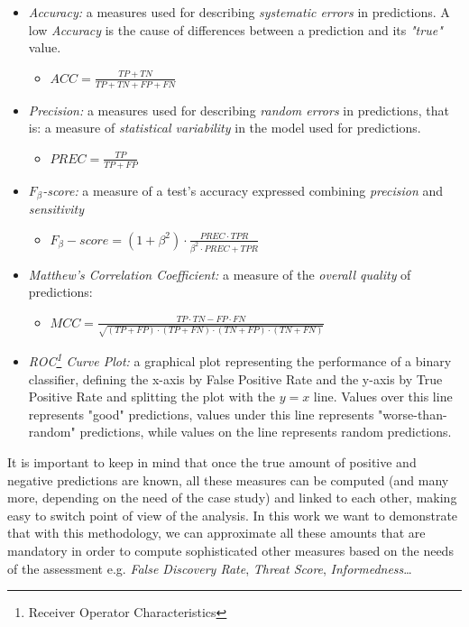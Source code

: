 \begin{itemize}
	\item \textsl{Accuracy:} a measures used for describing \textsl{systematic errors} in predictions. A low \textsl{Accuracy} is the cause of differences between a prediction and its \textsl{"true"} value.
	\begin{itemize}
		\item[] $ACC = \frac{TP+TN}{TP+TN+FP+FN}$
	\end{itemize}
	\item \textsl{Precision:} a measures used for describing \textsl{random errors} in predictions, that is: a measure of \textsl{statistical variability} in the model used for predictions.
	\begin{itemize}
	\item[] $PREC = \frac{TP}{TP+FP}$
	\end{itemize}
	\item \textsl{$F_{\beta}$-score:} a measure of a test's accuracy expressed combining \textsl{precision} and \textsl{sensitivity}
	\begin{itemize}
		\item[] $F_{\beta}-score = (1+\beta ^{2})\cdot \frac{PREC\cdot TPR}{\beta ^{2}\cdot PREC+TPR}$
	\end{itemize}
	\item \textsl{Matthew's Correlation Coefficient:} a measure of the \textsl{overall quality} of predictions:
	\begin{itemize}
		\item[] $MCC = \frac{TP\cdot TN - FP\cdot FN}{\sqrt{(TP+FP)\cdot (TP+FN)\cdot (TN+FP)\cdot (TN+FN)}}$
	\end{itemize}
	\item \textsl{ROC\footnote{Receiver Operator Characteristics} Curve Plot:} a graphical plot representing the performance of a binary classifier, defining the x-axis by False Positive Rate and the y-axis by True Positive Rate and splitting the plot with the $y=x$ line. Values over this line represents "good" predictions, values under this line represents "worse-than-random" predictions, while values on the line represents random predictions.
\end{itemize}

It is important to keep in mind that once the true amount of positive and negative predictions are known, all these measures can be computed (and many more, depending on the need of the case study) and linked to each other, making easy to switch point of view of the analysis. In this work we want to demonstrate that with this methodology, we can approximate all these amounts that are mandatory in order to compute sophisticated other measures based on the needs of the assessment e.g. \textsl{False Discovery Rate}, \textsl{Threat Score}, \textsl{Informedness}\dots \newline

